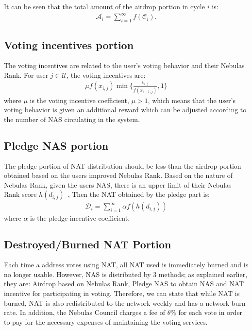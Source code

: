 It can be seen that the total amount of the airdrop portion in cycle $i$ is:
\begin{align}
\mathcal{A}_i = \sum_{i=1}^{\infty}f(\mathcal{C}_i).
\end{align}

\subsection{Voting incentives portion}
The voting incentives are related to the user's voting behavior and their Nebulas Rank. For user $j \in \mathcal{U}$, the voting incentives are:
\begin{align}
\mu f(x_{i,j}) \min\{\frac{v_{i,j}}{f(x_{i-1,j})},1\}
\end{align}
\noindent where $\mu$ is the voting incentive coefficient, $\mu > 1$, which means that the user's voting behavior is given an additional reward which can be adjusted according to the number of NAS circulating in the system.

\subsection{Pledge NAS portion}
The pledge portion of NAT distribution should be less than the airdrop portion obtained based on the users improved Nebulas Rank. Based on the nature of Nebulas Rank, given the users NAS, there is an upper limit of their Nebulas Rank  score $h(d_{i,j})$~\cite{ImproveNR},
Then the NAT obtained by the pledge part is:
\begin{align}
\mathcal{D}_i = \sum_{i=1}^{\infty}\alpha f(h(d_{i,j}))
\end{align}
\noindent where $\alpha$ is the pledge incentive coefficient.


\subsection{Destroyed/Burned NAT Portion}
\label{burn}
Each time a address votes using NAT, all NAT used is immediately burned and is no longer usable. However, NAS is distributed by 3 methods; as explained earlier, they are: Airdrop based on Nebulas Rank, Pledge NAS to obtain NAS and NAT incentive for participating in voting. Therefore, we can state that while NAT is burned, NAT is also redistributed to the network weekly and has a network burn rate. In addition, the Nebulas Council charges a fee of $\theta\%$ for each vote in order to pay for the necessary expenses of maintaining the voting services. 

